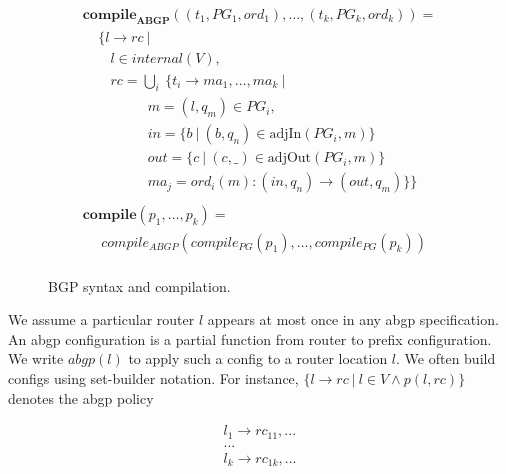 \documentclass[twocolumn]{sig-alternate-10pt}
\begin{document}
\begin{figure}[h!]
\begin{minipage}[t]{.5\linewidth}
  \end{minipage}
  ~~
  \vrule
  ~~
  \begin{minipage}[t]{.5\linewidth}
  \vspace*{-1\baselineskip}
  \[ \begin{array}{l}
     \textbf{compile}_\textbf{ABGP}( (t_1,PG_1,ord_1), \dots, (t_k,PG_k,ord_k) ) = \\
     ~~~~~ \{ l \rightarrow rc ~\vert~ \\
     ~~~~~~~~~ l \in internal(V), \\
     ~~~~~~~~~ rc = \bigcup_i~ \{ t_i \rightarrow ma_1, \dots, ma_k ~\vert~ \\
     ~~~~~~~~~~~~~~~~~~~~~ m = (l,q_m) \in PG_i, \\
     ~~~~~~~~~~~~~~~~~~~~~ in = \{ b ~\vert~ (b,q_n) \in \text{adjIn}(PG_i,m) \} \\
     ~~~~~~~~~~~~~~~~~~~~~ out = \{ c ~\vert~ (c,\_) \in \text{adjOut}(PG_i,m) \} \\
     ~~~~~~~~~~~~~~~~~~~~~ ma_j = ord_i(m) : (in,q_n) \rightarrow (out,q_m) \} \} \\
     \\
     \textbf{compile}( p_1, \dots, p_k ) = \\
     ~~~~~~ compile_{ABGP}(compile_{PG}(p_1), \dots, compile_{PG}(p_k)) \\
  \end{array} \]%

  \end{minipage}

  \vspace{1em}
  \hrulefill%
  \vspace{1em}

  \caption{BGP syntax and compilation.}
  \label{fig:abgp-syntax}
\end{figure}%

We assume a particular router $l$ appears at most once in any abgp specification.
An abgp configuration is a partial function from router to prefix configuration.
We write $abgp(l)$ to apply such a config to a router location $l$.
%
We often build configs using set-builder notation.  For instance,
$\{l \rightarrow rc ~\vert~ l \in V \wedge p(l,rc)\}$ denotes the abgp policy

\[ \begin{array}{c}
  l_1 \rightarrow rc_{11},... \\
  ...           \\
  l_k \rightarrow rc_{1k},... \\
\end{array} \]
\end{document}
